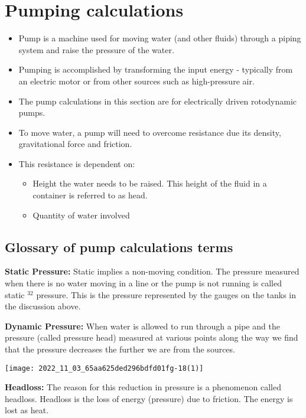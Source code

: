 \section{Pumping calculations}
\begin{itemize}
\item Pump is a machine used for moving water (and other fluids) through a piping system and raise the pressure of the water.
\item Pumping is accomplished by transforming the input energy - typically from an electric motor or from other sources such as high-pressure air.
\item The pump calculations in this section are for electrically driven rotodynamic pumps.
\item To move water, a pump will need to overcome resistance due its density, gravitational force and friction.
\item This resistance is dependent on:
\begin{itemize}
\item Height the water needs to be raised.  This height of the fluid in a container is referred to as head. 
\item Quantity of water involved
\end{itemize}
\end{itemize}

\subsection{Glossary of pump calculations terms}

\textbf{Static Pressure: } Static implies a non-moving condition.  The pressure measured when there is no water moving in a line or the pump is not running is called static $^{32}$ pressure. This is the pressure represented by the gauges on the tanks in the discussion above.

\textbf{Dynamic Pressure: } When water is allowed to run through a pipe and the pressure (called pressure head) measured at various points along the way we find that the pressure decreases the further we are from the sources.
\begin{center}
\texttt{[image: 2022\_11\_03\_65aa625ded296bdfd01fg-18(1)]}
\end{center}
\textbf{Headloss: }  The reason for this reduction in pressure is a phenomenon called headloss. Headloss is the loss of energy (pressure) due to friction. The energy is lost as heat.


